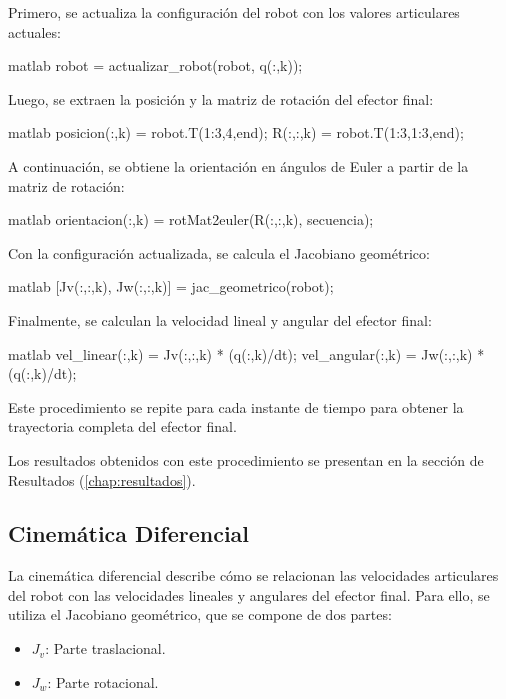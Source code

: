 Primero, se actualiza la configuración del robot con los valores articulares actuales:

\begin{matlabcode}{matlab}
	robot = actualizar_robot(robot, q(:,k));
\end{matlabcode}

Luego, se extraen la posición y la matriz de rotación del efector final:

\begin{matlabcode}{matlab}
	posicion(:,k) = robot.T(1:3,4,end);
	R(:,:,k) = robot.T(1:3,1:3,end);
\end{matlabcode}

A continuación, se obtiene la orientación en ángulos de Euler a partir de la matriz de rotación:

\begin{matlabcode}{matlab}
	orientacion(:,k) = rotMat2euler(R(:,:,k), secuencia);
\end{matlabcode}

Con la configuración actualizada, se calcula el Jacobiano geométrico:

\begin{matlabcode}{matlab}
	[Jv(:,:,k), Jw(:,:,k)] = jac_geometrico(robot);
\end{matlabcode}

Finalmente, se calculan la velocidad lineal y angular del efector final:

\begin{matlabcode}{matlab}
	vel_linear(:,k)  = Jv(:,:,k) * (q(:,k)/dt);
	vel_angular(:,k) = Jw(:,:,k) * (q(:,k)/dt);
\end{matlabcode}

Este procedimiento se repite para cada instante de tiempo para obtener la trayectoria completa del efector final.

Los resultados obtenidos con este procedimiento se presentan en la sección de Resultados (\autoref{chap:resultados}).

\subsection{Cinemática Diferencial}

La cinemática diferencial describe cómo se relacionan las velocidades articulares del robot con las velocidades lineales y angulares del efector final. Para ello, se utiliza el Jacobiano geométrico, que se compone de dos partes:
\begin{itemize}
	\item $J_v$: Parte traslacional.
	\item $J_w$: Parte rotacional.
\end{itemize}

